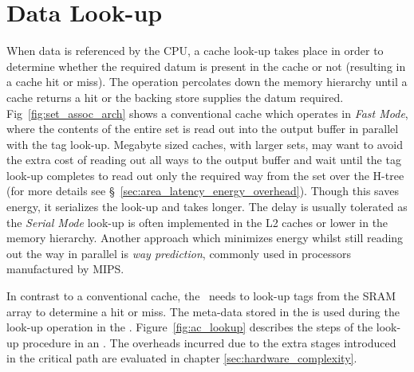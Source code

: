 \section{Data Look-up}

When data is referenced by the CPU, a cache look-up takes place in order to determine whether the required datum is present in the cache or not (resulting in a cache hit or miss). The operation percolates down the memory hierarchy until a cache returns a hit or the backing store supplies the datum required. Fig~\ref{fig:set_assoc_arch} shows a conventional cache which operates in \textit{Fast Mode}, where the contents of the entire set is read out into the output buffer in parallel with the tag look-up. Megabyte sized caches, with larger sets, may want to avoid the extra cost of reading out all ways to the output buffer and wait until the tag look-up completes to read out only the required way from the set over the H-tree (for more details see \S~\ref{sec:area_latency_energy_overhead}). Though this saves energy, it serializes the look-up and takes longer. The delay is usually tolerated as the \textit{Serial Mode} look-up is often implemented in the L2 caches or lower in the memory hierarchy. Another approach which minimizes energy whilst still reading out the way in parallel is \textit{way prediction}\cite{patent:DataCacheWayPrediction,patent:WayPredictionVirtualHint}, commonly used in processors manufactured by MIPS.

In contrast to a conventional cache, the \AC\ needs to look-up tags from the SRAM array to determine a hit or miss. The meta-data stored in the  is used during the look-up operation in the \AC{}. Figure~\ref{fig:ac_lookup} describes the steps of the look-up procedure in an \AC{}. The overheads incurred due to the extra stages introduced in the critical path are evaluated in chapter \ref{sec:hardware_complexity}.


